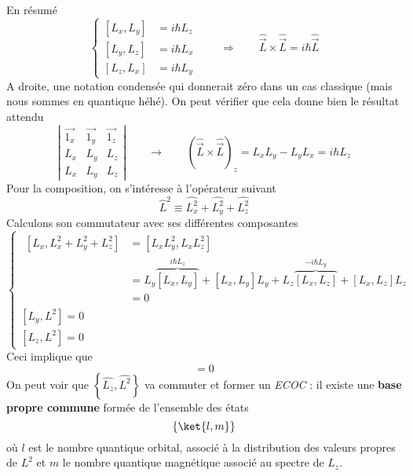 	En résumé
	\begin{equation}
	\left\{\begin{array}{ll}
	\left[L_x,L_y\right] &= i\hbar L_z\\
	\left[L_y,L_z\right] &= i\hbar L_x\\
	\left[L_z,L_x\right] &= i\hbar L_y		
	\end{array}\right.\qquad\Longrightarrow\qquad \hat{\vec{L}}\times\hat{\vec{L}} = i\hbar
	\hat{\vec{L}}
	\end{equation}
	A droite, une notation condensée qui donnerait zéro dans un cas classique (mais nous sommes 
	en quantique héhé). On peut vérifier que cela donne bien le résultat attendu
	\begin{equation}
	\left|\begin{array}{ccc}
	\vec{1_x} & \vec{1_y} & \vec{1_z}\\
	L_x & L_y & L_z\\
	L_x & L_y & L_z	
	\end{array}\right|\qquad \longrightarrow \qquad(\hat{\vec{L}}\times\hat{\vec{L}})_z = L_xL_y-L_yL_x
	 = i\hbar L_z
	\end{equation}
	Pour la composition, on s'intéresse à l'opérateur suivant
	\begin{equation}
	\hat{L}^2 \equiv \hat{L_x^2}+\hat{L_y^2}+\hat{L_z^2}
	\end{equation}
	Calculons son commutateur avec ses différentes composantes
	\begin{equation}
	\left\{\begin{array}{ll}
	\begin{array}{ll}
	\left[L_x,L_x^2+L_y^2+L_z^2\right] &= \left[L_xL_y^2, L_xL_z^2\right]\\
	&= L_y\overbrace{\left[L_x,L_y\right]}^{i\hbar L_z}+\left[L_x,L_y\right]L_y + L_z\overbrace{\left[L_x,L_z\right]}^{-i\hbar L_y}
	+\left[L_x,L_z\right]L_z\\
	&= 0
	\end{array}\\
	\left[L_y,L^2\right] = 0\\
	\left[L_z,L^2\right] = 0
	\end{array}\right.
	\end{equation}
	Ceci implique que
	\begin{equation}
	[\hat{\vec{L}},L^2] = 0
	\end{equation}
	On peut voir que $\left\{\hat{L_z},\hat{L^2}\right\}$ va commuter et former un \textit{ECOC} 
	: il existe une \textbf{base propre commune} formée de l'ensemble des états
	\begin{equation}
	\left\{\ket{l,m}\right\}
	\end{equation}
	où $l$ est le nombre quantique orbital, associé à la distribution des valeurs propres
	 de $L^2$ et $m$ le nombre quantique magnétique associé au spectre de $L_z$. 


